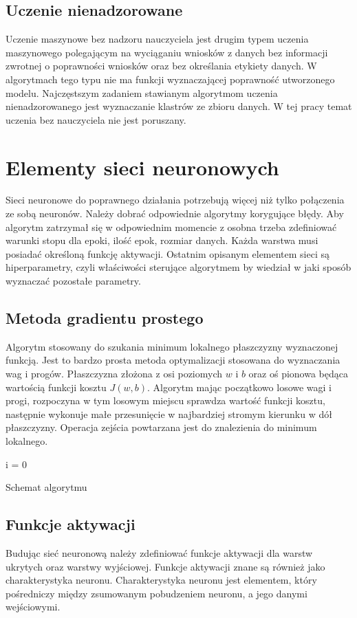 \documentclass[12pt,a4paper,twoside,titlepage,openright]{book}
\begin{document}
\subsection*{Uczenie nienadzorowane}
Uczenie maszynowe bez nadzoru nauczyciela jest drugim typem uczenia maszynowego polegającym na wyciąganiu wniosków z danych bez informacji zwrotnej o poprawności wniosków oraz bez określania etykiety danych. W algorytmach tego typu nie ma funkcji wyznaczającej poprawność utworzonego modelu. Najczęstszym zadaniem stawianym algorytmom uczenia nienadzorowanego jest wyznaczanie klastrów ze zbioru danych. W tej pracy temat uczenia bez nauczyciela nie jest poruszany.

\section{Elementy sieci neuronowych} 
Sieci neuronowe do poprawnego działania potrzebują więcej niż tylko połączenia ze sobą neuronów. Należy dobrać odpowiednie algorytmy korygujące błędy. Aby algorytm zatrzymał się w odpowiednim momencie z osobna trzeba zdefiniować warunki stopu dla epoki, ilość epok, rozmiar danych. Każda warstwa musi posiadać określoną funkcję aktywacji. Ostatnim opisanym elementem sieci są hiperparametry, czyli właściwości sterujące algorytmem by wiedział w jaki sposób wyznaczać pozostałe parametry.

\subsection{Metoda gradientu prostego}
Algorytm stosowany do szukania minimum lokalnego płaszczyzny wyznaczonej funkcją. Jest to bardzo prosta metoda optymalizacji stosowana do wyznaczania wag i progów. Płaszczyzna złożona z osi poziomych \(w\) i \(b\) oraz oś pionowa będąca wartością funkcji kosztu \(J(w,b)\). Algorytm mając początkowo losowe wagi i progi, rozpoczyna w tym losowym miejscu sprawdza wartość funkcji kosztu, następnie wykonuje małe przesunięcie w najbardziej stromym kierunku w dół płaszczyzny. Operacja zejścia powtarzana jest do znalezienia do minimum lokalnego.

\begin{algorithm}
i = 0\;
\caption{Schemat algorytmu}
\end{algorithm}

\subsection{Funkcje aktywacji}
Budując sieć neuronową należy zdefiniować funkcje aktywacji dla warstw ukrytych oraz warstwy wyjściowej. Funkcje aktywacji znane są również jako charakterystyka neuronu. Charakterystyka neuronu jest elementem, który pośredniczy między zsumowanym pobudzeniem neuronu, a jego danymi wejściowymi. 
\end{document}
